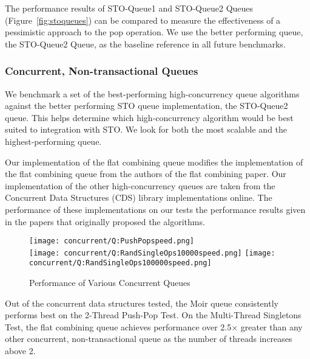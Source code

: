 The performance results of STO-Queue1 and STO-Queue2 Queues (Figure~\ref{fig:stoqueues}) can be compared to measure the effectiveness of a pessimistic approach to the pop operation. We use the better performing queue, the STO-Queue2 Queue, as the baseline reference in all future benchmarks.

\subsubsection{Concurrent, Non-transactional Queues}

We benchmark a set of the best-performing high-concurrency queue algorithms against the better performing STO queue implementation, the STO-Queue2 queue. This helps determine which high-concurrency algorithm would be best suited to integration with STO. We look for both the most scalable and the highest-performing queue.
 
 Our implementation of the flat combining queue modifies the implementation of the flat combining queue from the authors of the flat combining paper\cite{flatcombining}. Our implementation of the other high-concurrency queues are taken from the Concurrent Data Structures (CDS) library implementations online\cite{libcds}. The performance of these implementations on our tests the performance results given in the papers that originally proposed the algorithms.

\begin{figure}[h!]
\centering
    \texttt{[image: concurrent/Q:PushPopspeed.png]}\\
    \texttt{[image: concurrent/Q:RandSingleOps10000speed.png]}
    \texttt{[image: concurrent/Q:RandSingleOps100000speed.png]}
\caption{Performance of Various Concurrent Queues}
\label{fig:concurrent_queues}
\end{figure}

Out of the concurrent data structures tested, the Moir queue\cite{queue2} consistently performs best on the 2-Thread Push-Pop Test. On the Multi-Thread Singletons Test, the flat combining queue achieves performance over 2.5$\times$ greater than any other concurrent, non-transactional queue as the number of threads increases above 2.

